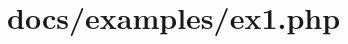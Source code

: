 \hypertarget{docs_2examples_2ex1_8php-example}{
\section{docs/examples/ex1.php}
}

\begin{DoxyCodeInclude}
\end{DoxyCodeInclude}
 